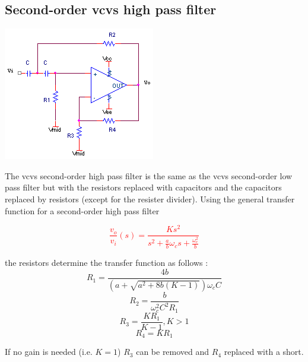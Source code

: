 \subsection{Second-order \ac{vcvs} high pass filter}
\begin{center}
	\includegraphics{schematics/2ndorder_vcvs_HPfilter.PNG}
\end{center}
The \ac{vcvs} second-order high pass filter is the same as the \ac{vcvs} second-order low pass filter but with the resistors replaced with capacitors and the capacitors replaced by resistors (except for the resister divider). Using the  general transfer function for a second-order high pass filter

\textcolor{red}{
\begin{equation}
\frac{v_{o}}{v_{i}}(s) = \frac{Ks^{2}}{s^{2} + \frac{a}{b}\omega_{c}s + \frac{\omega_{c}^{2}}{b}}
\label{eq:2ndorder_vcvs_HPfilter}
\end{equation}
}

the resistors determine the transfer function as follows \autocite[130-131]{op-amp-circuits-johnson}:
\begin{equation}
R_1 = \frac{4b}{(a+\sqrt{a^2 + 8b(K-1)})\omega_{c}C}
\end{equation}
\begin{equation}
R_2 = \frac{b}{\omega_{c}^2 C^2 R_1}
\end{equation}
\begin{equation}
R_3 = \frac{KR_1}{K-1}, K > 1
\end{equation}
\begin{equation}
R_4 = KR_1
\end{equation}

If no gain is needed (i.e. $K = 1$) $R_3$ can be removed and $R_4$ replaced with a short.

